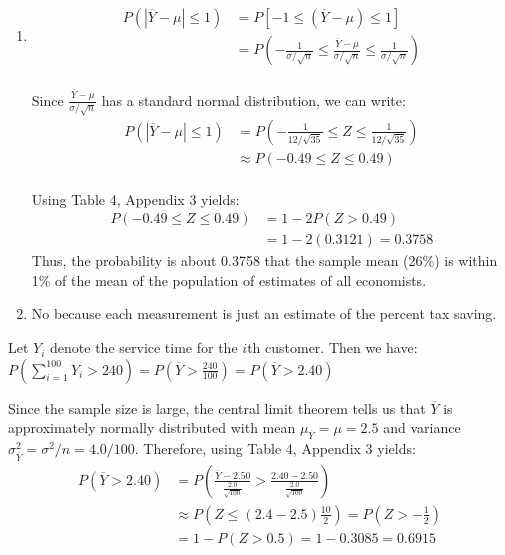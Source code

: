\documentclass[12pt]{article}
\newenvironment{problem}[2][Problem]{\begin{trivlist}
\item[\hskip \labelsep {\bfseries #1}\hskip \labelsep {\bfseries #2.}]}{\end{trivlist}}
\begin{document}
\begin{problem}{7.48}
\end{problem}

\begin{enumerate}[label=\alph*]
	\item\begin{align*}
	P(|\overline{Y} - \mu| \leq 1)
	&= P[-1 \leq (\overline{Y} - \mu) \leq 1]\\
	&= P(-\frac{1}{\sigma/\sqrt{n}} \leq \frac{\overline{Y} - \mu}{\sigma/\sqrt{n}} \leq \frac{1}{\sigma/\sqrt{n}})
	\end{align*}\\
	Since $\frac{\overline{Y} - \mu}{\sigma/\sqrt{n}}$ has a standard normal distribution, we can write:
	\begin{align*}
	P(|\overline{Y} - \mu| \leq 1) &= P(-\frac{1}{12/\sqrt{35}} \leq Z \leq \frac{1}{12/\sqrt{35}})\\
	&\approx P(-0.49 \leq Z \leq 0.49)
	\end{align*}\\
	Using Table 4, Appendix 3 yields:
	\begin{align*}
	P(-0.49 \leq Z \leq 0.49) &= 1 - 2P(Z > 0.49)\\&= 1 - 2(0.3121) = 0.3758
	\end{align*}
	Thus, the probability is about 0.3758 that the sample mean (26\%) is within 1\% of the mean of the population of estimates of all economists.
	\item No because each measurement is just an estimate of the percent tax saving.
\end{enumerate}

\begin{problem}{7.62}
\end{problem}
Let $Y_i$ denote the service time for the $i$th customer. Then we have:\\
$P(\sum_{i=1}^{100}Y_i > 240) = P(\overline{Y} > \frac{240}{100}) = P(\overline{Y} > 2.40)$

Since the sample size is large, the central limit theorem tells us that $\overline{Y}$ is approximately normally distributed with mean $\mu_{\overline{Y}} = \mu = 2.5$ and variance $\sigma_{\overline{Y}}^2 = \sigma^2/n = 4.0/100$. Therefore, using Table 4, Appendix 3 yields:
\begin{align*}
P(\overline{Y} > 2.40) &= P(\frac{\overline{Y} - 2.50}{\frac{2.0}{\sqrt{100}}} > \frac{2.40 - 2.50}{\frac{2.0}{\sqrt{100}}})\\
&\approx P(Z \leq (2.4 - 2.5)\frac{10}{2}) = P(Z > -\frac{1}{2})\\
&= 1 - P(Z > 0.5) = 1 - 0.3085 = 0.6915
\end{align*}
\end{document}
